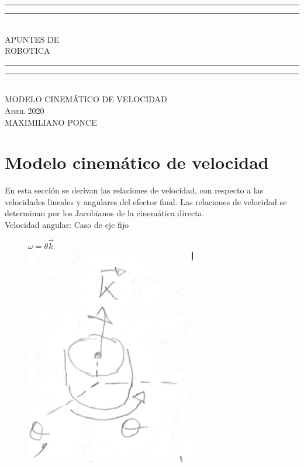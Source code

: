 \documentclass[10pt,a4paper]{article}
\newlength{\drop}
\begin{document}
\begin{titlepage}

\textheight
    \centering
    \vspace*{\baselineskip}
    \rule{\textwidth}{1.6pt}\vspace*{-\baselineskip}\vspace*{2pt}
    \rule{\textwidth}{0.6pt}\\[\baselineskip]
    {\LARGE APUNTES DE\\[0.2\baselineskip] ROBOTICA}\\[0.2\baselineskip]
    \rule{\textwidth}{0.4pt}\vspace*{-\baselineskip}\vspace{3.2pt}
    \rule{\textwidth}{1.6pt}\\[\baselineskip]
    \scshape
    MODELO CINEMÁTICO DE VELOCIDAD \\
    \vspace*{2\baselineskip}
    \vfill
    {\scshape Abril 2020} \\
    {\large MAXIMILIANO PONCE}\par

\end{titlepage}

\tableofcontents
\newpage

\section{Modelo cinemático de velocidad}
En esta sección se derivan las relaciones de velocidad, con respecto a las velocidades lineales y angulares del efector final. Las relaciones de velocidad se determinan por los Jacobianos de la cinemática directa.\\

Velocidad angular: Caso de eje fijo\\

\begin{figure}[h]
     \centering
     \begin{center}
		 $\omega = \dot{\theta} \vec{k}$ \\
     	\includegraphics[width=0.2\linewidth]{f1}
     \end{center}
\end{figure}
\end{document}
